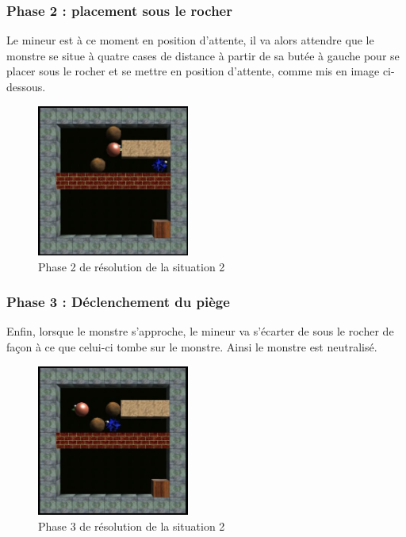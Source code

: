 \documentclass[a4paper,11pt]{article}
\begin{document}
	 \newpage
	\subsubsection{Phase 2 : placement sous le rocher}
	
Le mineur est \`a ce moment en position d'attente, il va alors attendre que le monstre se situe \`a quatre cases de distance \`a partir de sa but\'ee \`a gauche pour se placer sous le rocher et se mettre en position d'attente, comme mis en image ci-dessous.

	\begin{figure}[h]
			\center
			\includegraphics[width=5cm]{situation2-3}
			\caption{\label{situation22} Phase 2 de r\'esolution de la situation 2 }
		\end{figure}
		
	\subsubsection{Phase 3 : D\'eclenchement du pi\`ege}
	
Enfin, lorsque le monstre s'approche, le mineur va s'\'ecarter de sous le rocher de façon \`a ce que celui-ci tombe sur le monstre. Ainsi le monstre est neutralis\'e.

		\begin{figure}[h]
			\center
			\includegraphics[width=5cm]{situation2-4}
			\caption{\label{situation22} Phase 3 de r\'esolution de la situation 2 }
		\end{figure}
		
\end{document}
